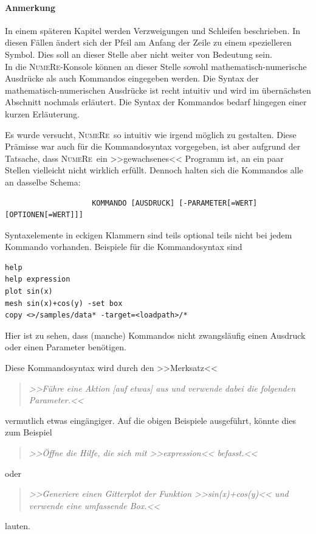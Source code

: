 \documentclass[DIV=14,headsepline,footsepline]{scrbook}
\newcommand{\NR}{\textsc{Nu\-me\-Re}}
\begin{document}
				\paragraph{Anmerkung}
					In einem späteren Kapitel werden Verzweigungen und Schleifen beschrieben. In diesen Fällen ändert sich der Pfeil am Anfang der Zeile zu einem spezielleren Symbol. Dies soll an dieser Stelle aber nicht weiter von Bedeutung sein.
				\bigskip\\
				In die \NR-Konsole können an dieser Stelle sowohl mathematisch-numerische Ausdrücke als auch Kommandos eingegeben werden. Die Syntax der mathematisch-numerischen Ausdrücke ist recht intuitiv und wird im übernächsten Abschnitt nochmals erläutert. Die Syntax der Kommandos bedarf hingegen einer kurzen Erläuterung.
				
				Es wurde versucht, \NR\ so intuitiv wie irgend möglich zu gestalten. Diese Prämisse war auch für die Kommandosyntax vorgegeben, ist aber aufgrund der Tatsache, dass \NR\ ein >>gewachsenes<< Programm ist, an ein paar Stellen vielleicht nicht wirklich erfüllt. Dennoch halten sich die Kommandos alle an dasselbe Schema:
				\begin{verbatim}
					KOMMANDO [AUSDRUCK] [-PARAMETER[=WERT] [OPTIONEN[=WERT]]]
				\end{verbatim}
				Syntaxelemente in eckigen Klammern sind teils optional teils nicht bei jedem Kommando vorhanden. Beispiele für die Kommandosyntax sind
				\begin{lstlisting}
help
help expression
plot sin(x)
mesh sin(x)+cos(y) -set box
copy <>/samples/data* -target=<loadpath>/*
				\end{lstlisting}
				Hier ist zu sehen, dass (manche) Kommandos nicht zwangsläufig einen Ausdruck oder einen Parameter benötigen.
				
				Diese Kommandosyntax wird durch den >>Merksatz<< 
				\begin{quotation}
					\noindent\emph{>>Führe eine Aktion [auf etwas] aus und verwende dabei die folgenden Parameter.<<}
				\end{quotation}
				vermutlich etwas eingängiger. Auf die obigen Beispiele ausgeführt, könnte dies zum Beispiel
				\begin{quotation}
					\noindent\emph{>>Öffne die Hilfe, die sich mit >>expression<< befasst.<<}
				\end{quotation}
				oder
				\begin{quotation}
					\noindent\emph{>>Generiere einen Gitterplot der Funktion >>sin(x)+cos(y)<< und verwende eine umfassende Box.<<}
				\end{quotation}
				lauten.
				
\end{document}
